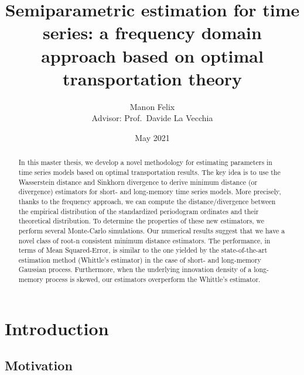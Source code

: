 \documentclass[
  11pt,
]{article}
\title{Semiparametric estimation for time series: a frequency domain
approach based on optimal transportation theory}
\author{Manon Felix\\
Advisor: Prof.~Davide La Vecchia}
\date{May 2021}
\begin{document}
\maketitle
\begin{abstract}
In this master thesis, we develop a novel methodology for estimating
parameters in time series models based on optimal transportation
results. The key idea is to use the Wasserstein distance and Sinkhorn
divergence to derive minimum distance (or divergence) estimators for
short- and long-memory time series models. More precisely, thanks to the
frequency approach, we can compute the distance/divergence between the
empirical distribution of the standardized periodogram ordinates and
their theoretical distribution. To determine the properties of these new
estimators, we perform several Monte-Carlo simulations. Our numerical
results suggest that we have a novel class of root-n consistent minimum
distance estimators. The performance, in terms of Mean Squared-Error, is
similar to the one yielded by the state-of-the-art estimation method
(Whittle's estimator) in the case of short- and long-memory Gaussian
process. Furthermore, when the underlying innovation density of a
long-memory process is skewed, our estimators overperform the Whittle's
estimator.
\end{abstract}

\newpage

\tableofcontents

\newpage

\hypertarget{introduction}{%
\section{Introduction}\label{introduction}}

\hypertarget{motivation}{%
\subsection{Motivation}\label{motivation}}
\end{document}

